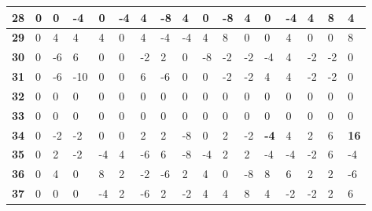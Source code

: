 \begin{longtable}[c]{|l|l|l|l|l|l|l|l|l|l|l|l|l|l|l|l|l|}
\textbf{28} & 0          & 0          & -4         & 0          & -4         & 4          & -8         & 4          & 0          & -8         & 4           & 0           & -4          & 4           & 8           & 4           \\ \hline
\textbf{29} & 0          & 4          & 4          & 4          & 0          & 4          & -4         & -4         & 4          & 8          & 0           & 0           & 4           & 0           & 0           & 8           \\ \hline
\textbf{30} & 0          & -6         & 6          & 0          & 0          & -2         & 2          & 0          & -8         & -2         & -2          & -4          & 4           & -2          & -2          & 0           \\ \hline
\textbf{31} & 0          & -6         & -10        & 0          & 0          & 6          & -6         & 0          & 0          & -2         & -2          & 4           & 4           & -2          & -2          & 0           \\ \hline
\textbf{32} & 0          & 0          & 0          & 0          & 0          & 0          & 0          & 0          & 0          & 0          & 0           & 0           & 0           & 0           & 0           & 0           \\ \hline
\textbf{33} & 0          & 0          & 0          & 0          & 0          & 0          & 0          & 0          & 0          & 0          & 0           & 0           & 0           & 0           & 0           & 0           \\ \hline
\textbf{34} & 0          & -2         & -2         & 0          & 0          & 2          & 2          & -8         & 0          & 2          & -2          & \textbf{-4} & 4           & 2           & 6           & \textbf{16} \\ \hline
\textbf{35} & 0          & 2          & -2         & -4         & 4          & -6         & 6          & -8         & -4         & 2          & 2           & -4          & -4          & -2          & 6           & -4          \\ \hline
\textbf{36} & 0          & 4          & 0          & 8          & 2          & -2         & -6         & 2          & 4          & 0          & -8          & 8           & 6           & 2           & 2           & -6          \\ \hline
\textbf{37} & 0          & 0          & 0          & -4         & 2          & -6         & 2          & -2         & 4          & 4          & 8           & 4           & -2          & -2          & 2           & 6           \\ \hline

\end{longtable}

